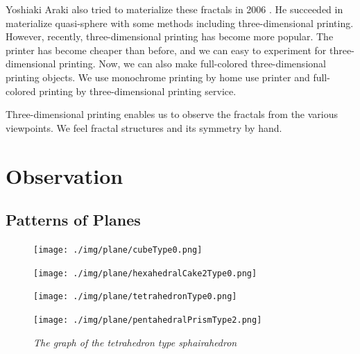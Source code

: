 \documentclass[suppldata, dvipdfmx]{interact}
\theoremstyle{plain}%
\theoremstyle{definition}
\theoremstyle{remark}
\theoremstyle{problemstyle}
\begin{document}
Yoshiaki Araki also tried to materialize these fractals in 2006
\cite{araki2006materializing}.
He succeeded in materialize quasi-sphere with some methods including
three-dimensional printing.
However, recently, three-dimensional printing has become more popular.
The printer has become cheaper than before, and we can easy to
experiment for three-dimensional printing.
Now, we can also make full-colored three-dimensional printing objects.
We use monochrome printing by home use printer and full-colored
printing by three-dimensional printing service.

Three-dimensional printing enables us to observe the fractals from the
various viewpoints.
We feel fractal structures and its symmetry by hand.

\section{Observation}

\subsection{Patterns of Planes}

\begin{figure}[h!tbp]
  \begin{minipage}[t]{0.23\textwidth}
   \centering
   \texttt{[image: ./img/plane/cubeType0.png]}
   \label{fig:planeCube}
  \end{minipage}
  \hspace*{\fill}
  \begin{minipage}[t]{0.23\textwidth}
   \centering
   \texttt{[image: ./img/plane/hexahedralCake2Type0.png]}
   \label{fig:planeCake}
  \end{minipage}
 \hspace*{\fill}
  \begin{minipage}[t]{0.23\textwidth}
   \centering
   \texttt{[image: ./img/plane/tetrahedronType0.png]}
   \label{fig:planeTetra}
  \end{minipage}
 \hspace*{\fill}
  \begin{minipage}[t]{0.23\textwidth}
   \centering
   \texttt{[image: ./img/plane/pentahedralPrismType2.png]}
   \label{fig:planePentaPrism}
  \end{minipage}
 \caption{\textit{The graph of the tetrahedron type sphairahedron}}
 \label{fig:planes}
 \hspace*{\fill}
\end{figure}
\end{document}
